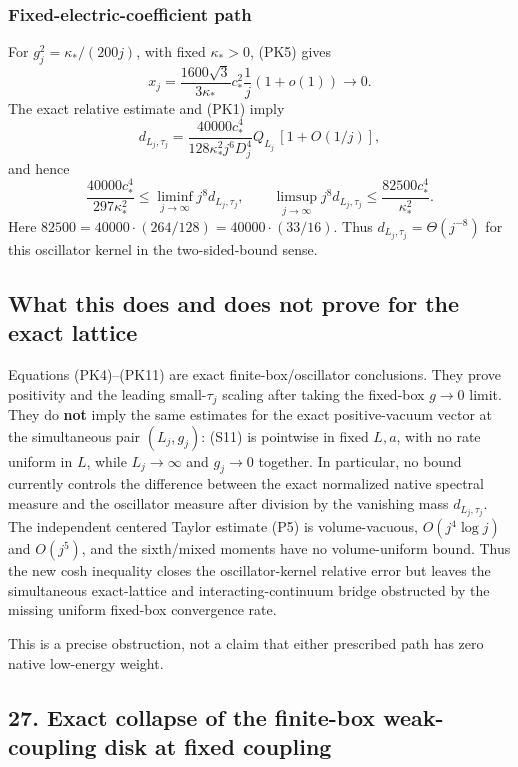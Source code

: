 \documentclass[
  11pt,
]{article}
\begin{document}
\subsubsection{Fixed-electric-coefficient
path}\label{fixed-electric-coefficient-path}

For \(g_j^2=\kappa_*/(200j)\), with fixed \(\kappa_*>0\), (PK5) gives \[
 x_j=\frac{1600\sqrt3}{3\kappa_*}c_*^2\frac1j(1+o(1))
 \longrightarrow0. \tag{PK9}
\] The exact relative estimate and (PK1) imply \[
 d_{L_j,\tau_j}
 =\frac{40000c_*^4}{128\kappa_*^2j^6D_j^4}Q_{L_j}
 \,[1+O(1/j)], \tag{PK10}
\] and hence \[
 \frac{40000c_*^4}{297\kappa_*^2}
 \le\liminf_{j\to\infty}j^8d_{L_j,\tau_j},
 \qquad
 \limsup_{j\to\infty}j^8d_{L_j,\tau_j}
 \le\frac{82500c_*^4}{\kappa_*^2}. \tag{PK11}
\] Here \(82500=40000\cdot(264/128)=40000\cdot(33/16)\). Thus
\(d_{L_j,\tau_j}=\Theta(j^{-8})\) for this oscillator kernel in the
two-sided-bound sense.

\subsection{What this does and does not prove for the exact
lattice}\label{what-this-does-and-does-not-prove-for-the-exact-lattice}

Equations (PK4)--(PK11) are exact finite-box/oscillator conclusions.
They prove positivity and the leading small-\(\tau_j\) scaling after
taking the fixed-box \(g\to0\) limit. They do \textbf{not} imply the
same estimates for the exact positive-vacuum vector at the simultaneous
pair \((L_j,g_j)\): (S11) is pointwise in fixed \(L,a\), with no rate
uniform in \(L\), while \(L_j\to\infty\) and \(g_j\to0\) together. In
particular, no bound currently controls the difference between the exact
normalized native spectral measure and the oscillator measure after
division by the vanishing mass \(d_{L_j,\tau_j}\). The independent
centered Taylor estimate (P5) is volume-vacuous, \(O(j^4\log j)\) and
\(O(j^5)\), and the sixth/mixed moments have no volume-uniform bound.
Thus the new cosh inequality closes the oscillator-kernel relative error
but leaves the simultaneous exact-lattice and interacting-continuum
bridge obstructed by the missing uniform fixed-box convergence rate.

This is a precise obstruction, not a claim that either prescribed path
has zero native low-energy weight.

\subsection{27. Exact collapse of the finite-box weak-coupling disk at
fixed
coupling}\label{exact-collapse-of-the-finite-box-weak-coupling-disk-at-fixed-coupling}
\end{document}
